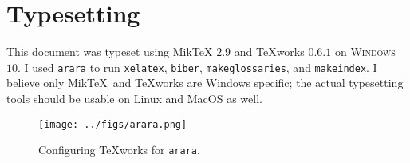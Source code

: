 \chapter{Typesetting}

This document was typeset using Mik\TeX{} $2.9$ \cite{Miktex2017} 
and {\TeX}works $0.6.1$ \cite{Texworks2017} 
on \textsc{Windows} $10$. 
I used \texttt{arara} \cite{arara2017} 
to run \texttt{xelatex}, \texttt{biber}, \texttt{makeglossaries},  and
\texttt{makeindex}.
I believe only Mik\TeX\  and {\TeX}works are Windows specific; 
the actual typesetting tools should be usable on Linux and MacOS as well.

\begin{figure}[htbp]
\centering
\texttt{[image: ../figs/arara.png]}
\caption{Configuring {\TeX}works for \texttt{arara}.}
\label{fig:arara}
\end{figure}
